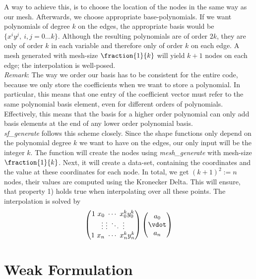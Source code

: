\documentclass[a4paper,12pt]{article}
\begin{document}
A way to achieve this, is to choose the location of the nodes in the same way as our mesh. Afterwards, we choose appropriate base-polynomials. If we want polynomials of degree $k$ on the edges, the appropriate basis would be $\{x^iy^j, \ i,j=0...k\}$. Although the resulting polynomials are of order $2k$, they are only of order $k$ in each variable and therefore only of order $k$ on each edge. A mesh generated with mesh-size $\fraction{1}{k}$ will yield $k+1$ nodes on each edge; the interpolation is well-posed. \\
\textit{Remark}: The way we order our basis has to be consistent for the entire code, because we only store the coefficients when we want to store a polynomial. In particular, this means that one entry of the coefficient vector must refer to the same polynomial basis element, even for different orders of polynomials. Effectively, this means that the basis for a higher order polynomial can only add basis elements at the end of any lower order polynomial basis. \\

\textit{sf\_generate} follows this scheme closely. Since the shape functions only depend on the polynomial degree $k$ we want to have on the edges, our only input will be the integer $k$. The function will create the nodes using \textit{mesh\_generate} with mesh-size $\fraction{1}{k}$. Next, it will create a data-set, containing the coordinates and the value at these coordinates for each node. In total, we get $(k+1)^2:=n$ nodes, their values are computed using the Kronecker Delta. This will ensure, that property 1) holds true when interpolating over all these points. The interpolation is solved by 
\[\begin{pmatrix} 1 \ x_0 \ \cdots\ x_0^ky_0^k \\ \vdots \ \vdots \ \ddots \ \vdots \\ 1 \ x_{n} \ \cdots \ x_{n}^ky_{n}^k \end{pmatrix}
\begin{pmatrix} a_0 \\ \vdot \\ a_n \end{pmatrix}\]


\section{Weak Formulation}
\end{document}
